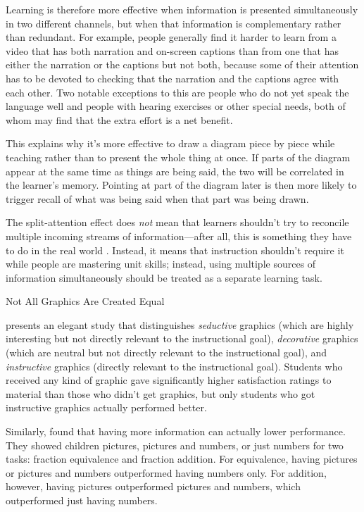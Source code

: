 Learning is therefore more effective when information is presented
simultaneously in two different channels, but when that information is
complementary rather than redundant. For example, people generally find
it harder to learn from a video that has both narration and on-screen
captions than from one that has either the narration or the captions but
not both, because some of their attention has to be devoted to checking
that the narration and the captions agree with each other. Two notable
exceptions to this are people who do not yet speak the language well and
people with hearing exercises or other special needs, both of whom may
find that the extra effort is a net benefit.

This explains why it's more effective to draw a diagram piece by piece
while teaching rather than to present the whole thing at once. If parts
of the diagram appear at the same time as things are being said, the two
will be correlated in the learner's memory. Pointing at part of the
diagram later is then more likely to trigger recall of what was being
said when that part was being drawn.

The split-attention effect does \emph{not} mean that learners shouldn't try
to reconcile multiple incoming streams of information---after all, this is
something they have to do in the real world \cite{Atki2000}. Instead,
it means that instruction shouldn't require it while people are
mastering unit skills; instead, using multiple sources of information
simultaneously should be treated as a separate learning task.

\begin{aside}{Not All Graphics Are Created Equal}

\cite{Sung2012} presents an elegant study that distinguishes
\emph{seductive} graphics (which are highly interesting but not directly
relevant to the instructional goal), \emph{decorative} graphics (which are
neutral but not directly relevant to the instructional goal), and
\emph{instructive} graphics (directly relevant to the instructional goal).
Students who received any kind of graphic gave significantly higher
satisfaction ratings to material than those who didn't get graphics,
but only students who got instructive graphics actually performed
better.

Similarly, \cite{Stam2013,Stam2014} found that having more
information can actually lower performance. They showed children
pictures, pictures and numbers, or just numbers for two tasks:
fraction equivalence and fraction addition. For equivalence, having
pictures or pictures and numbers outperformed having numbers only. For
addition, however, having pictures outperformed pictures and numbers,
which outperformed just having numbers.

\end{aside}

